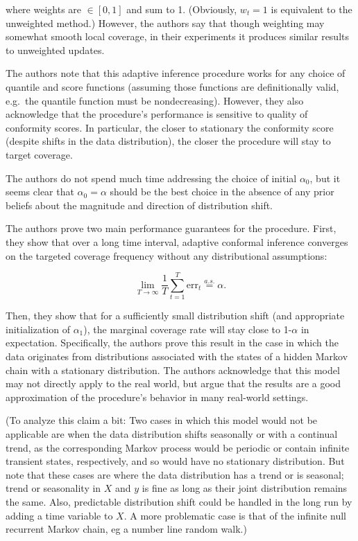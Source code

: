 \documentclass[
]{article}
\begin{document}
where weights are \(\in[0,1]\) and sum to 1. (Obviously, \(w_t=1\) is
equivalent to the unweighted method.) However, the authors say that
though weighting may somewhat smooth local coverage, in their
experiments it produces similar results to unweighted updates.

The authors note that this adaptive inference procedure works for any
choice of quantile and score functions (assuming those functions are
definitionally valid, e.g.~the quantile function must be nondecreasing).
However, they also acknowledge that the procedure's performance is
sensitive to quality of conformity scores. In particular, the closer to
stationary the conformity score (despite shifts in the data
distribution), the closer the procedure will stay to target coverage.

The authors do not spend much time addressing the choice of initial
\(\alpha_0\), but it seems clear that \(\alpha_0=\alpha\) should be the
best choice in the absence of any prior beliefs about the magnitude and
direction of distribution shift.

The authors prove two main performance guarantees for the procedure.
First, they show that over a long time interval, adaptive conformal
inference converges on the targeted coverage frequency without any
distributional assumptions:

\[ \lim_{T \to \infty} \frac{1}{T} \sum_{t=1}^T \textrm{err}_t \stackrel{a.s.}{=} \alpha.\]

Then, they show that for a sufficiently small distribution shift (and
appropriate initialization of \(\alpha_1\)), the marginal coverage rate
will stay close to 1-\(\alpha\) in expectation. Specifically, the
authors prove this result in the case in which the data originates from
distributions associated with the states of a hidden Markov chain with a
stationary distribution. The authors acknowledge that this model may not
directly apply to the real world, but argue that the results are a good
approximation of the procedure's behavior in many real-world settings.

(To analyze this claim a bit: Two cases in which this model would not be
applicable are when the data distribution shifts seasonally or with a
continual trend, as the corresponding Markov process would be periodic
or contain infinite transient states, respectively, and so would have no
stationary distribution. But note that these cases are where the data
distribution has a trend or is seasonal; trend or seasonality in \(X\)
and \(y\) is fine as long as their joint distribution remains the same.
Also, predictable distribution shift could be handled in the long run by
adding a time variable to \(X\). A more problematic case is that of the
infinite null recurrent Markov chain, eg a number line random walk.)
\end{document}
